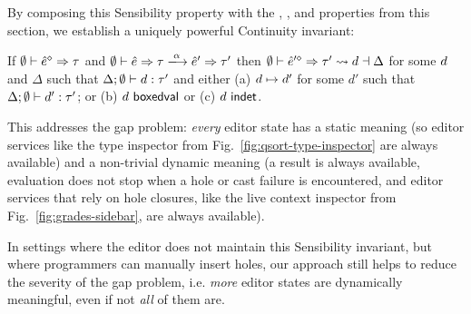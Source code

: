 By composing this Sensibility property with the ,
,  and
 properties from this section, we establish a
uniquely powerful Continuity invariant:
\begin{corol}[Continuity]
  \label{thrm:continuity}
  If $\emptyset \vdash \hat{e}^{\diamond} \Rightarrow \tau$ and
    $\performSyn{\emptyset}{\zexp}{\htau}{\alpha}{\zexp'}{\tau'}$ then
    $\emptyset \vdash \hat{e}'^{\diamond} \Rightarrow \tau' \leadsto d \dashv \Delta$
      for some $d$ and $\Delta$ such that
$\Delta; \emptyset \vdash d : \tau'$
and either
  (a) $d \mapsto d'$ for some $d'$ such that $\Delta; \emptyset \vdash d' : \tau'$; or
  (b) $d~\mathsf{boxedval}$ or
  (c) $d~\mathsf{indet}$.
\end{corol}

This addresses the gap problem: \emph{every} editor state has a {static
meaning} (so editor services like the type inspector from Fig.~\ref{fig:qsort-type-inspector} are always available) and a non-trivial {dynamic meaning} (a result is always available, evaluation does not stop when a hole or cast failure is encountered, and editor services that rely on hole closures, like the live context inspector from Fig.~\ref{fig:grades-sidebar}, are always available).

In settings where the editor does not maintain this Sensibility invariant, but where programmers can manually insert holes, our approach still helps to reduce the severity of the gap problem, i.e. \emph{more} editor states are dynamically meaningful, even if not \emph{all} of them are.%
%


